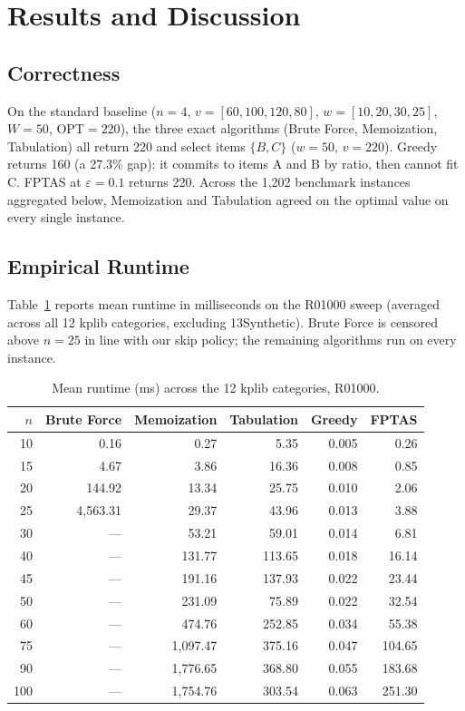 \documentclass[11pt, a4paper]{article}
\begin{document}
\section{Results and Discussion}\label{sec:results}

\subsection{Correctness}
On the standard baseline ($n{=}4$, $v{=}[60,100,120,80]$, $w{=}[10,20,30,25]$,
$W{=}50$, OPT$=220$), the three exact algorithms (Brute Force, Memoization,
Tabulation) all return 220 and select items $\{B,C\}$ ($w{=}50$, $v{=}220$).
Greedy returns 160 (a 27.3\% gap): it commits to items A and B by ratio, then
cannot fit C. FPTAS at $\varepsilon{=}0.1$ returns 220. Across the 1{,}202
benchmark instances aggregated below, Memoization and Tabulation agreed on the
optimal value on every single instance.

\subsection{Empirical Runtime}
Table~\ref{tab:rt} reports mean runtime in milliseconds on the R01000 sweep
(averaged across all 12 kplib categories, excluding 13Synthetic). Brute Force
is censored above $n{=}25$ in line with our skip policy; the remaining
algorithms run on every instance.

\begin{table}[H]
\centering
\caption{Mean runtime (ms) across the 12 kplib categories, R01000.}
\label{tab:rt}
\small
\begin{tabular}{@{}rrrrrr@{}}
\toprule
$n$ & Brute Force & Memoization & Tabulation & Greedy & FPTAS \\
\midrule
10  & 0.16        & 0.27     & 5.35     & 0.005 & 0.26 \\
15  & 4.67        & 3.86     & 16.36    & 0.008 & 0.85 \\
20  & 144.92      & 13.34    & 25.75    & 0.010 & 2.06 \\
25  & 4{,}563.31  & 29.37    & 43.96    & 0.013 & 3.88 \\
30  & ---         & 53.21    & 59.01    & 0.014 & 6.81 \\
40  & ---         & 131.77   & 113.65   & 0.018 & 16.14 \\
45  & ---         & 191.16   & 137.93   & 0.022 & 23.44 \\
50  & ---         & 231.09   & 75.89    & 0.022 & 32.54 \\
60  & ---         & 474.76   & 252.85   & 0.034 & 55.38 \\
75  & ---         & 1{,}097.47 & 375.16   & 0.047 & 104.65 \\
90  & ---         & 1{,}776.65 & 368.80   & 0.055 & 183.68 \\
100 & ---         & 1{,}754.76 & 303.54   & 0.063 & 251.30 \\
\bottomrule
\end{tabular}
\end{table}
\end{document}
